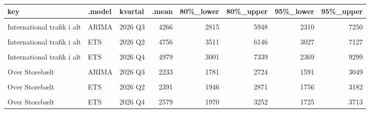 \documentclass[
  danish,
]{article}
\begin{document}
\begin{table}
{\centering
\begin{tabular}[t]{lllrrrrr}
\toprule
key & .model & kvartal & .mean & 80\%\_lower & 80\%\_upper & 95\%\_lower & 95\%\_upper\\
\midrule
\cellcolor{gray!10}{International trafik i alt} & \cellcolor{gray!10}{ARIMA} & \cellcolor{gray!10}{2026 Q2} & \cellcolor{gray!10}{4274} & \cellcolor{gray!10}{3082} & \cellcolor{gray!10}{5615} & \cellcolor{gray!10}{2629} & \cellcolor{gray!10}{6582}\\
International trafik i alt & ARIMA & 2026 Q3 & 4266 & 2815 & 5948 & 2310 & 7250\\
\cellcolor{gray!10}{International trafik i alt} & \cellcolor{gray!10}{ARIMA} & \cellcolor{gray!10}{2026 Q4} & \cellcolor{gray!10}{3900} & \cellcolor{gray!10}{2465} & \cellcolor{gray!10}{5587} & \cellcolor{gray!10}{1984} & \cellcolor{gray!10}{6939}\\
International trafik i alt & ETS & 2026 Q2 & 4756 & 3511 & 6146 & 3027 & 7127\\
\cellcolor{gray!10}{International trafik i alt} & \cellcolor{gray!10}{ETS} & \cellcolor{gray!10}{2026 Q3} & \cellcolor{gray!10}{5664} & \cellcolor{gray!10}{3742} & \cellcolor{gray!10}{7891} & \cellcolor{gray!10}{3072} & \cellcolor{gray!10}{9613}\\
\addlinespace
International trafik i alt & ETS & 2026 Q4 & 4979 & 3001 & 7339 & 2369 & 9299\\
\cellcolor{gray!10}{Over Storebælt} & \cellcolor{gray!10}{ARIMA} & \cellcolor{gray!10}{2026 Q2} & \cellcolor{gray!10}{2284} & \cellcolor{gray!10}{1859} & \cellcolor{gray!10}{2743} & \cellcolor{gray!10}{1677} & \cellcolor{gray!10}{3041}\\
Over Storebælt & ARIMA & 2026 Q3 & 2233 & 1781 & 2724 & 1591 & 3049\\
\cellcolor{gray!10}{Over Storebælt} & \cellcolor{gray!10}{ARIMA} & \cellcolor{gray!10}{2026 Q4} & \cellcolor{gray!10}{2239} & \cellcolor{gray!10}{1767} & \cellcolor{gray!10}{2755} & \cellcolor{gray!10}{1571} & \cellcolor{gray!10}{3098}\\
Over Storebælt & ETS & 2026 Q2 & 2391 & 1946 & 2871 & 1756 & 3182\\
\addlinespace
\cellcolor{gray!10}{Over Storebælt} & \cellcolor{gray!10}{ETS} & \cellcolor{gray!10}{2026 Q3} & \cellcolor{gray!10}{2490} & \cellcolor{gray!10}{1960} & \cellcolor{gray!10}{3069} & \cellcolor{gray!10}{1740} & \cellcolor{gray!10}{3456}\\
Over Storebælt & ETS & 2026 Q4 & 2579 & 1970 & 3252 & 1725 & 3713\\
\bottomrule
\end{tabular}

}
\end{table}
\end{document}
